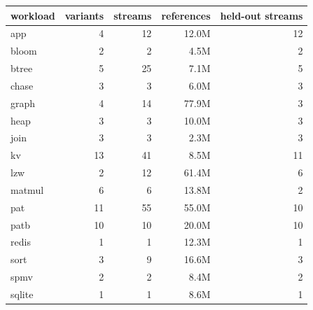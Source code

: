 \begin{tabular}{lrrrr}
\toprule
workload & variants & streams & references & held-out streams \\
\midrule
app & 4 & 12 & 12.0M & 12 \\
bloom & 2 & 2 & 4.5M & 2 \\
btree & 5 & 25 & 7.1M & 5 \\
chase & 3 & 3 & 6.0M & 3 \\
graph & 4 & 14 & 77.9M & 3 \\
heap & 3 & 3 & 10.0M & 3 \\
join & 3 & 3 & 2.3M & 3 \\
kv & 13 & 41 & 8.5M & 11 \\
lzw & 2 & 12 & 61.4M & 6 \\
matmul & 6 & 6 & 13.8M & 2 \\
pat & 11 & 55 & 55.0M & 10 \\
patb & 10 & 10 & 20.0M & 10 \\
redis & 1 & 1 & 12.3M & 1 \\
sort & 3 & 9 & 16.6M & 3 \\
spmv & 2 & 2 & 8.4M & 2 \\
sqlite & 1 & 1 & 8.6M & 1 \\
\bottomrule
\end{tabular}
